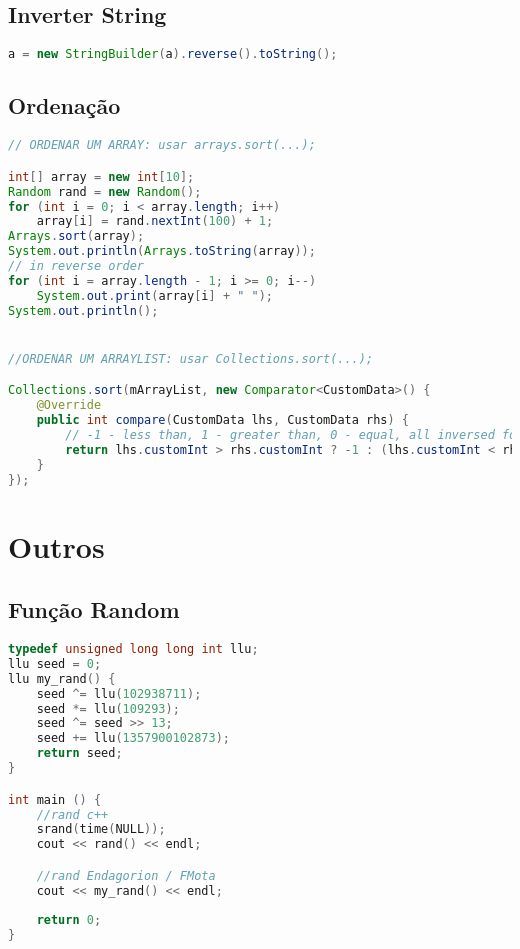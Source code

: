 \documentclass[12pt,a4paper,twoside]{report}
\begin{document}
\section{Inverter String}

\noindent\begin{lstlisting}[caption=Inverter String,language=Java]
    a = new StringBuilder(a).reverse().toString();
\end{lstlisting}

\section{Ordenação}

\noindent\begin{lstlisting}[caption=Diferentes tipos de sort,language=Java]
// ORDENAR UM ARRAY: usar arrays.sort(...);

int[] array = new int[10];
Random rand = new Random();
for (int i = 0; i < array.length; i++)
    array[i] = rand.nextInt(100) + 1;
Arrays.sort(array);
System.out.println(Arrays.toString(array));
// in reverse order
for (int i = array.length - 1; i >= 0; i--)
    System.out.print(array[i] + " ");
System.out.println();


//ORDENAR UM ARRAYLIST: usar Collections.sort(...);

Collections.sort(mArrayList, new Comparator<CustomData>() {
    @Override
    public int compare(CustomData lhs, CustomData rhs) {
        // -1 - less than, 1 - greater than, 0 - equal, all inversed for descending
        return lhs.customInt > rhs.customInt ? -1 : (lhs.customInt < rhs.customInt) ? 1 : 0;
    }
});

\end{lstlisting}

\chapter{Outros}

\section{Função Random}
\noindent\begin{lstlisting}[caption=Rand long long,language=C++]
typedef unsigned long long int llu;
llu seed = 0;
llu my_rand() {
    seed ^= llu(102938711);
    seed *= llu(109293);
    seed ^= seed >> 13;
    seed += llu(1357900102873);
    return seed;
}

int main () {
    //rand c++
    srand(time(NULL));
    cout << rand() << endl;

    //rand Endagorion / FMota
    cout << my_rand() << endl;
    
    return 0;
}
\end{lstlisting}
\end{document}
